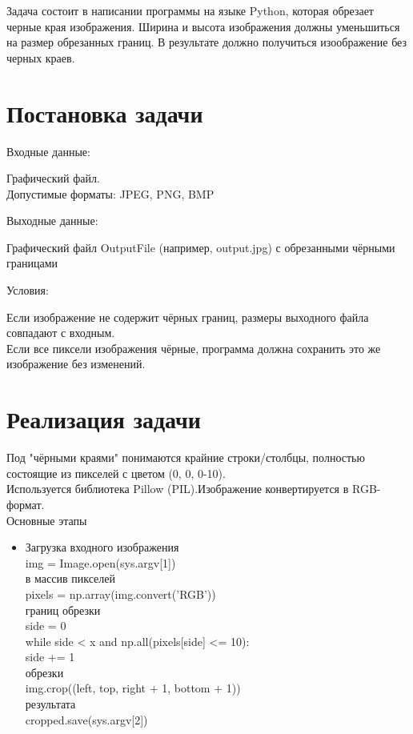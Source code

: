 \documentclass[a4paper, 12pt]{article}
\theoremstyle{mytheoremstyle}
\theoremstyle{myremarkstyle}
\numberwithin{equation}{section}
\begin{document}
Задача состоит в написании программы на языке Python, которая обрезает черные края изображения. Ширина и высота изображения должны уменьшиться на размер обрезанных границ. В результате должно получиться изоображение без черных краев.

\section{Постановка задачи}

Входные данные:
\begin{itemize}
\setlength{\itemindent}{2cm}
Графический файл.\\
Допустимые форматы: JPEG, PNG, BMP
\end{itemize}

Выходные данные:
\begin{itemize}
\setlength{\itemindent}{1cm}
 Графический файл OutputFile (например, output.jpg) с обрезанными чёрными границами
\end{itemize}

Условия:
\begin{itemize}
\setlength{\itemindent}{2cm}
 Если изображение не содержит чёрных границ, размеры выходного файла совпадают с входным.\\
 Если все пиксели изображения чёрные, программа должна сохранить это же изображение без изменений.
\end{itemize}



\newpage
\section{Реализация задачи}

Под "чёрными краями" понимаются крайние строки/столбцы, полностью состоящие из пикселей с цветом (0, 0, 0-10).\\
Используется библиотека Pillow (PIL).Изображение конвертируется в RGB-формат.\\


Основные этапы
\begin{itemize}
\setlength{\itemindent}{2cm}
\item Загрузка входного изображения\\
 img = Image.open(sys.argv[1]) \\

 в массив пикселей\\
pixels = np.array(img.convert('RGB'))\\
 границ обрезки\\
side = 0\\
    while side < x and np.all(pixels[side] <= 10):\\
    side += 1\\
  
    

 обрезки\\
img.crop((left, top, right + 1, bottom + 1))\\
 результата\\
cropped.save(sys.argv[2])

\end{itemize}
\end{document}
